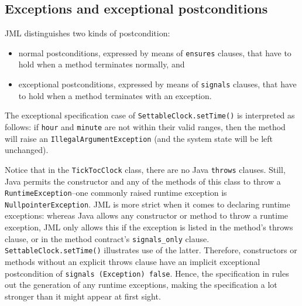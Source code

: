 \documentclass{llncs}
\begin{document}

\subsection{Exceptions and exceptional postconditions}
\label{Sec:Exceptions}

JML distinguishes two kinds of postcondition: 
\begin{itemize}
  \item normal postconditions, expressed
    by means of \texttt{ensures} clauses, that have to hold when a method
    terminates normally, and
    \item exceptional postconditions, expressed by means of \texttt{signals}
      clauses, that have to hold when a method terminates with an exception.
\end{itemize}
%
The exceptional specification case of \texttt{SettableClock.setTime()} is
interpreted as follows: if \texttt{hour} and \texttt{minute} are not within
their valid ranges, then the method will raise an \texttt{IllegalArgumentException} 
(and the system state will be left unchanged).

Notice that in the \texttt{TickTocClock} class,
there are no Java \texttt{throws} clauses.
Still, Java permits the constructor and any of the methods of this class to throw a 
\texttt{RuntimeException}--one commonly raised runtime exception is 
\texttt{NullpointerException}.
%
JML is more strict when it comes to declaring runtime exceptions: 
whereas Java allows any constructor or method to throw a runtime exception, JML only 
allows this if the exception is listed in the method's throws clause,
or in the method contract's \texttt{signals\_only} clause.
\texttt{SettableClock.setTime()} illustrates use of the latter.
%
Therefore, constructors or methods without an explicit throws clause
have an implicit exceptional postcondition of \texttt{signals (Exception) false}.
%
Hence, the specification in  
rules out the generation of any runtime exceptions, making the specification a lot stronger 
than it might appear at first sight.
\end{document}
